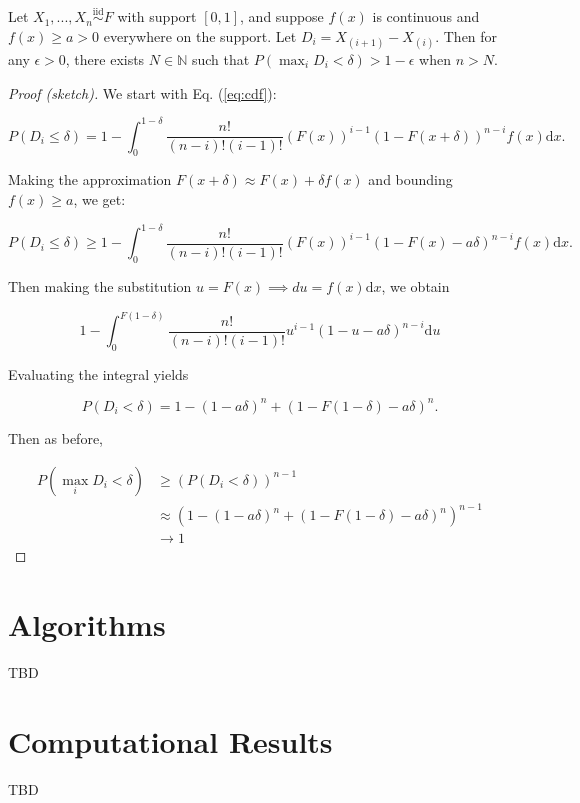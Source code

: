 \documentclass[
  11pt,
]{article}
\begin{document}
\begin{theorem}
Let $X_1, ..., X_n \stackrel{\mathrm{iid}}{\sim}F$ with support $[0, 1]$, and suppose $f(x)$ is continuous and $f(x) \geq a > 0$ everywhere on the support. 
Let $D_i = X_{(i+1)} - X_{(i)}$. 
Then for any $\epsilon > 0$, there exists $N \in \mathbb{N}$ such that $P(\max_i D_i < \delta) > 1 - \epsilon$ when $n > N$.
\end{theorem}

\begin{proof}[Proof (sketch)]
We start with Eq. (\ref{eq:cdf}):

$$P(D_i \leq \delta) = 1 - \int_0^{1-\delta} \frac{n!}{(n-i)! (i-1)!} (F(x))^{i-1} (1 - F(x + \delta))^{n-i} f(x) \mathrm{d}x.$$

Making the approximation $F(x+\delta) \approx F(x) + \delta f(x)$ 
and bounding $f(x) \geq a$, we get:

$$P(D_i \leq \delta) \geq 1 - \int_0^{1-\delta} \frac{n!}{(n-i)! (i-1)!} (F(x))^{i-1} (1 - F(x) - a \delta)^{n-i} f(x) \mathrm{d}x.$$

Then making the substitution $u = F(x) \implies du = f(x) \mathrm{d}x$, we obtain 

$$1 - \int_0^{F(1-\delta)} \frac{n!}{(n-i)! (i-1)!} u^{i-1} (1 - u - a \delta)^{n-i} \mathrm{d}u$$

Evaluating the integral yields

$$P(D_i < \delta) = 1 - (1 - a \delta)^n + (1 - F(1-\delta) - a \delta)^n.$$

Then as before,

$$
\begin{aligned}
P(\max_i D_i < \delta) & \geq (P(D_i < \delta))^{n-1} \\
& \approx (1 - (1 - a \delta)^n + (1 - F(1-\delta) - a \delta)^n)^{n-1} \\
& \to 1
\end{aligned}
$$

\end{proof}

\hypertarget{algorithms}{%
\section{Algorithms}\label{algorithms}}

TBD

\hypertarget{computational-results}{%
\section{Computational Results}\label{computational-results}}

TBD

  
\end{document}

